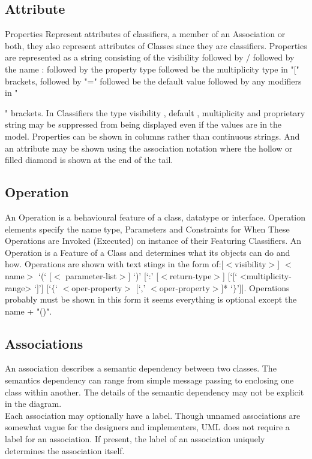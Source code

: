 \subsection{Attribute}
Properties Represent attributes of classifiers, a member of an Association or both, they also represent attributes of Classes since they are classifiers. Properties are represented as a string consisting of the visibility followed by / followed by the name : followed by the property type followed be the multiplicity type in "[" brackets, followed by "=" followed be the default value followed by any modifiers in "{" brackets. In Classifiers the type visibility , default , multiplicity and proprietary string may be suppressed from being displayed even if the values are in the model. Properties can be shown in columns rather than continuous strings. And an attribute may be shown using the association notation where the hollow or filled diamond is shown at the end of the tail. \cite{OMG-UML_Attributes}
\subsection{Operation}
An Operation is a behavioural feature of a class, datatype or interface. Operation elements specify the name type, Parameters and Constraints for When These Operations are Invoked (Executed) on instance of their Featuring Classifiers. An Operation is a Feature of a Class and determines what its objects can do and how. Operations are shown with text stings in the form of:[$<$visibility$>$] $<$name$>$ ‘(‘ [$<$ parameter-list$>$] ‘)’ [‘:’ [$<$return-type$>$] [‘[‘ <multiplicity-range> ‘]’] [‘$\{$‘ $<$oper-property$>$ [‘,’ $<$oper-property$>$]* ‘$\}$’]]. Operations probably must be shown in this form it seems everything is optional except the name + "()".
\cite{OMG-UML}
\subsection{Associations}
An association describes a semantic dependency between two classes. The semantics dependency can range from simple message passing to enclosing one class within another. The details of the semantic dependency may not be explicit in the diagram.\\

 Each association may optionally have a label. Though unnamed associations are somewhat vague for the designers and implementers, UML does not require a label for an association. If present, the label of an association uniquely determines the association itself.\\ 
 
}
